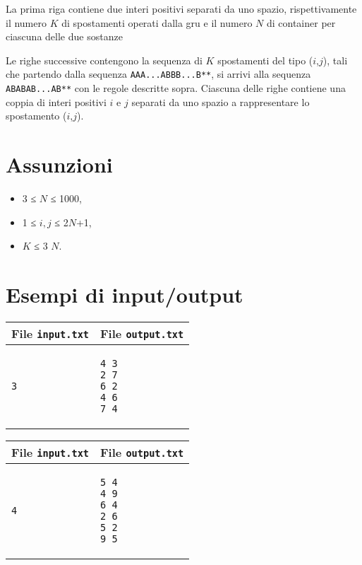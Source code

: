 \documentclass[a4paper,11pt]{article}
\begin{document}
La prima riga contiene due interi positivi separati da uno spazio,
rispettivamente il numero $K$ di spostamenti operati dalla
gru e il numero $N$ di container per ciascuna delle due
sostanze

Le righe successive contengono la sequenza di $K$ spostamenti
del tipo ($i$,$j$), tali che partendo dalla
sequenza \texttt{AAA...ABBB...B**}, si arrivi alla
sequenza \texttt{ABABAB...AB**} con le regole descritte sopra.
Ciascuna delle righe contiene una coppia di interi
positivi $i$ e $j$ separati da uno spazio a
rappresentare lo spostamento ($i$,$j$).

  \section*{Assunzioni}
  \begin{itemize}
  
    \item  3 ≤ $N$ ≤ 1000,
    \item  1 ≤ $i,j$ ≤ 2$N$+1,
    \item  $K$ ≤ 3 $N$.
  \end{itemize}

\section*{Esempi di input/output}

  
    \noindent
    \begin{tabular}{p{11cm}|p{5cm}}
    \toprule
    \textbf{File \texttt{input.txt}}
    & \textbf{File \texttt{output.txt}}
    \\
    \midrule
    \scriptsize
    \begin{verbatim}
3
\end{verbatim}
    &
    \scriptsize
    \begin{verbatim}
4 3
2 7
6 2
4 6
7 4
\end{verbatim}
    \\
    \bottomrule
    \end{tabular}
  
    \noindent
    \begin{tabular}{p{11cm}|p{5cm}}
    \toprule
    \textbf{File \texttt{input.txt}}
    & \textbf{File \texttt{output.txt}}
    \\
    \midrule
    \scriptsize
    \begin{verbatim}
4
\end{verbatim}
    &
    \scriptsize
    \begin{verbatim}
5 4
4 9
6 4
2 6
5 2
9 5 
\end{verbatim}
    \\
    \bottomrule
    \end{tabular}
  
\end{document}
